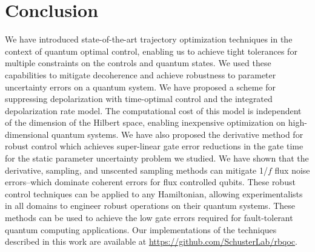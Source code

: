 \section{Conclusion}
We have introduced state-of-the-art trajectory optimization
techniques in the context of quantum optimal control, enabling
us to achieve tight tolerances for multiple constraints on the
controls and quantum states. We used these capabilities
to mitigate decoherence and
achieve robustness to parameter uncertainty
errors on a quantum system.
We have proposed a scheme for suppressing
depolarization with time-optimal
control and the integrated depolarization rate model.
The computational cost of this model is
independent of the dimension of the Hilbert space, enabling
inexpensive optimization on high-dimensional quantum systems.
We have also proposed the derivative method for robust control which achieves
super-linear gate error reductions in the gate time for the static parameter
uncertainty problem we studied.
We have shown that the derivative, sampling, and unscented sampling methods
can mitigate 1/$f$ flux noise errors--which
dominate coherent errors for flux controlled qubits.
These robust control techniques can be applied
to any Hamiltonian,
allowing experimentalists in all domains to engineer robust
operations on their quantum systems.
These methods can be used to achieve the low gate errors
required for fault-tolerant quantum computing applications. Our
implementations of the techniques described in this work are available
at \url{https://github.com/SchusterLab/rbqoc}.
